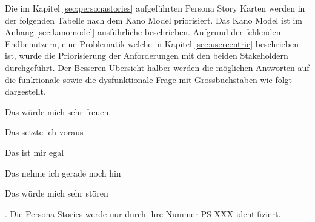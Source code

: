 Die im Kapitel \ref{sec:personastories} aufgeführten Persona Story Karten werden in der folgenden Tabelle nach dem Kano Model priorisiert. Das Kano Model ist im Anhang \ref{sec:kanomodel} ausführliche beschrieben. Aufgrund der fehlenden Endbenutzern, eine Problematik welche in Kapitel \ref{sec:usercentric} beschrieben ist, wurde die Priorisierung der Anforderungen mit den beiden Stakeholdern durchgeführt. Der Besseren Übersicht halber werden die möglichen Antworten auf die funktionale sowie die dysfunktionale Frage mit Grossbuchstaben wie folgt dargestellt.
\begin{enumerate*}[label={\Alph*)},font={\color{red!50!black}\bfseries}]
	\item Das würde mich sehr freuen
	\item Das setzte ich voraus
	\item Das ist mir egal
	\item Das nehme ich gerade noch hin
	\item Das würde mich sehr stören
\end{enumerate*}. Die Persona Stories werde nur durch ihre Nummer PS-XXX identifiziert.

